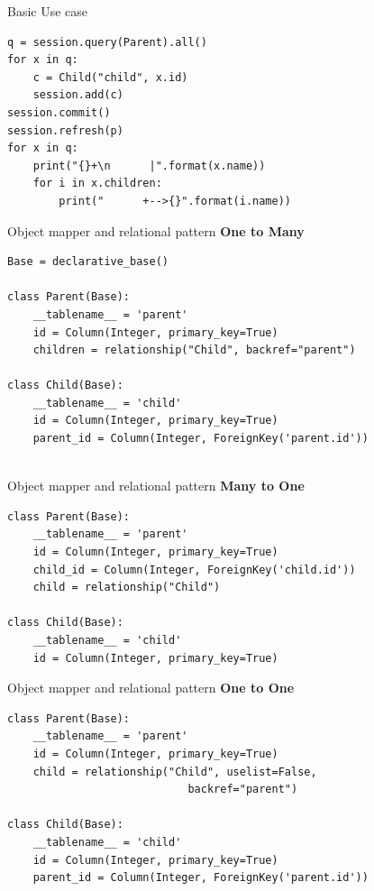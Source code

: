 \documentclass[seagull]{beamer}
\begin{document}
\begin{frame}[fragile]{Basic Use case}
\begin{verbatim}
q = session.query(Parent).all()
for x in q:
    c = Child("child", x.id)
    session.add(c)
session.commit()
session.refresh(p)
for x in q:
    print("{}+\n      |".format(x.name))
    for i in x.children:
        print("      +-->{}".format(i.name))
\end{verbatim}
\end{frame}
\begin{frame}[fragile]{Object mapper and relational pattern}
\textbf{One to Many}
\begin{verbatim}
Base = declarative_base()

class Parent(Base):
    __tablename__ = 'parent'
    id = Column(Integer, primary_key=True)
    children = relationship("Child", backref="parent")

class Child(Base):
    __tablename__ = 'child'
    id = Column(Integer, primary_key=True)
    parent_id = Column(Integer, ForeignKey('parent.id'))
        
\end{verbatim}
\end{frame}

\begin{frame}[fragile]{Object mapper and relational pattern}
\textbf{Many to One}
\begin{verbatim}
class Parent(Base):
    __tablename__ = 'parent'
    id = Column(Integer, primary_key=True)
    child_id = Column(Integer, ForeignKey('child.id'))
    child = relationship("Child")

class Child(Base):
    __tablename__ = 'child'
    id = Column(Integer, primary_key=True)
\end{verbatim}
\end{frame}

\begin{frame}[fragile]{Object mapper and relational pattern}
\textbf{One to One}
\begin{verbatim}
class Parent(Base):
    __tablename__ = 'parent'
    id = Column(Integer, primary_key=True)
    child = relationship("Child", uselist=False, 
    						backref="parent")

class Child(Base):
    __tablename__ = 'child'
    id = Column(Integer, primary_key=True)
    parent_id = Column(Integer, ForeignKey('parent.id'))
\end{verbatim}
\end{frame}
\end{document}
